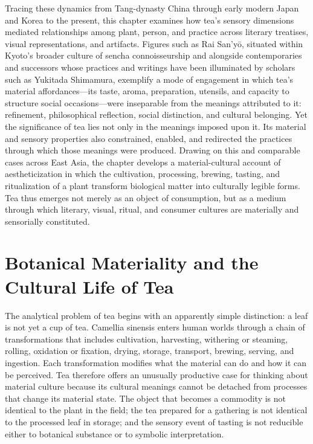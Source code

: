 \documentclass[11pt,a4paper]{article}
\begin{document}
Tracing these dynamics from Tang-dynasty China through early modern Japan and Korea to the present, this chapter examines how tea's sensory dimensions mediated relationships among plant, person, and practice across literary treatises, visual representations, and artifacts. Figures such as Rai San'yō, situated within Kyoto's broader culture of sencha connoisseurship and alongside contemporaries and successors whose practices and writings have been illuminated by scholars such as Yukitada Shimamura, exemplify a mode of engagement in which tea's material affordances---its taste, aroma, preparation, utensils, and capacity to structure social occasions---were inseparable from the meanings attributed to it: refinement, philosophical reflection, social distinction, and cultural belonging. Yet the significance of tea lies not only in the meanings imposed upon it. Its material and sensory properties also constrained, enabled, and redirected the practices through which those meanings were produced. Drawing on this and comparable cases across East Asia, the chapter develops a material-cultural account of aestheticization in which the cultivation, processing, brewing, tasting, and ritualization of a plant transform biological matter into culturally legible forms. Tea thus emerges not merely as an object of consumption, but as a medium through which literary, visual, ritual, and consumer cultures are materially and sensorially constituted.

\section{Botanical Materiality and the Cultural Life of Tea}

The analytical problem of tea begins with an apparently simple distinction: a leaf is not yet a cup of tea. Camellia sinensis enters human worlds through a chain of transformations that includes cultivation, harvesting, withering or steaming, rolling, oxidation or fixation, drying, storage, transport, brewing, serving, and ingestion. Each transformation modifies what the material can do and how it can be perceived. Tea therefore offers an unusually productive case for thinking about material culture because its cultural meanings cannot be detached from processes that change its material state. The object that becomes a commodity is not identical to the plant in the field; the tea prepared for a gathering is not identical to the processed leaf in storage; and the sensory event of tasting is not reducible either to botanical substance or to symbolic interpretation.
\end{document}
